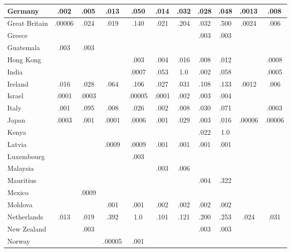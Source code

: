 \begin{table*}[h!]
\begin{tabular}{|P{37mm}|cc|cc|cc|cc|cc|}
Germany             &.002     &.005   &.013     &.050  &.014    &.032   &.028    &.048     &.0013  &.008 \\\hline
Great Britain             &.00006     &.024   &.019     &.140  &.021    &.204   &.032    &.500     &.0024  &.006 \\\hline
Greece             &     &   &     &  &   &  &.003    &.003     &  & \\\hline
Guatemala             &.003     &.003   &     &  &   &   &    &     &  & \\\hline
Hong Kong             &     &   &     &.003  &.004   &.016   &.008   &.012     &  &.0008 \\\hline
India             &    &   &     &.0007  &.053   &1.0   &.002    &.058     &  &.0005 \\\hline
Ireland             &.016     &.028   &.064     &.106  &.027    &.031   &.108    &.133     &.0012  &.006 \\\hline
Israel             &.0001     &.0003   &     &.00005  &.0001    &.002   &.003    &.004     &  & \\\hline
Italy            &.001     &.095   &.008    &.026  &.002    &.008   &.030    &.071     &  &.0003 \\\hline
Japan             &.0003     &.001   &.0001     &.0006  &.001    &.029   &.003    &.016     &.00006  &.00006 \\\hline
Kenya             &    &   &     &  &   &   &.022    &1.0     &  & \\\hline
Latvia             &     &  &.0009     &.0009  &.001    &.001   &.001    &.001     &  & \\\hline
Luxembourg             &    &   &     &.003  &    &   &    &     &  & \\\hline
Malaysia             &     &  &     &  &.003    &.006   &    &     &  & \\\hline
Mauritius             &     &   &     &  &    &   &.004    &.322     &  & \\\hline
Mexico             &     &.0009   &     &  &    &   &    &    &  & \\\hline
Moldova             &     &   &.001     &.001  &.002    &.002   &.002    &.002     &  & \\\hline
Netherlands             &.013     &.019   &.392     &1.0  &.101    &.121   &.200    &.253     &.024  &.031 \\\hline
New Zealand             &    &.003   &     &  &    &   &.003   &.003     &  & \\\hline
Norway             &    &   &.00005     &.001  &    &   &   &     &  & \\\hline

\end{tabular}
\end{table*}
